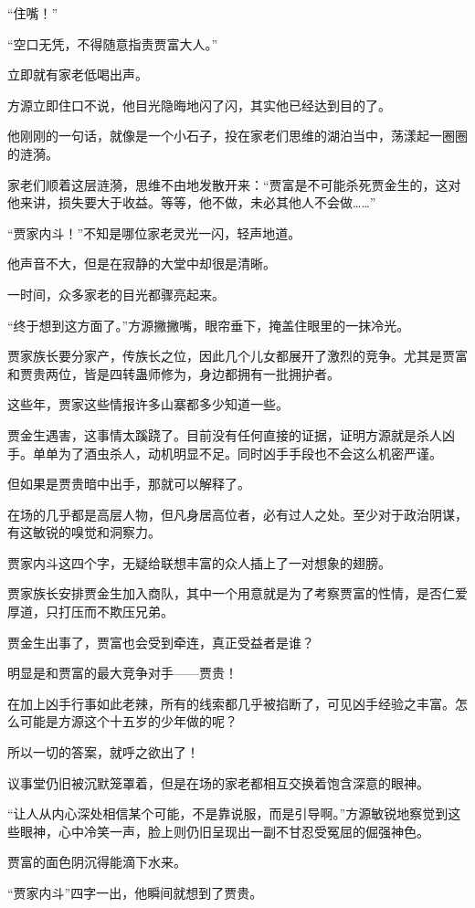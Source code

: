 \begin{this_body}
“住嘴！”

“空口无凭，不得随意指责贾富大人。”

立即就有家老低喝出声。

方源立即住口不说，他目光隐晦地闪了闪，其实他已经达到目的了。

他刚刚的一句话，就像是一个小石子，投在家老们思维的湖泊当中，荡漾起一圈圈的涟漪。

家老们顺着这层涟漪，思维不由地发散开来：“贾富是不可能杀死贾金生的，这对他来讲，损失要大于收益。等等，他不做，未必其他人不会做……”

“贾家内斗！”不知是哪位家老灵光一闪，轻声地道。

他声音不大，但是在寂静的大堂中却很是清晰。

一时间，众多家老的目光都骤亮起来。

“终于想到这方面了。”方源撇撇嘴，眼帘垂下，掩盖住眼里的一抹冷光。

贾家族长要分家产，传族长之位，因此几个儿女都展开了激烈的竞争。尤其是贾富和贾贵两位，皆是四转蛊师修为，身边都拥有一批拥护者。

这些年，贾家这些情报许多山寨都多少知道一些。

贾金生遇害，这事情太蹊跷了。目前没有任何直接的证据，证明方源就是杀人凶手。单单为了酒虫杀人，动机明显不足。同时凶手手段也不会这么机密严谨。

但如果是贾贵暗中出手，那就可以解释了。

在场的几乎都是高层人物，但凡身居高位者，必有过人之处。至少对于政治阴谋，有这敏锐的嗅觉和洞察力。

贾家内斗这四个字，无疑给联想丰富的众人插上了一对想象的翅膀。

贾家族长安排贾金生加入商队，其中一个用意就是为了考察贾富的性情，是否仁爱厚道，只打压而不欺压兄弟。

贾金生出事了，贾富也会受到牵连，真正受益者是谁？

明显是和贾富的最大竞争对手——贾贵！

在加上凶手行事如此老辣，所有的线索都几乎被掐断了，可见凶手经验之丰富。怎么可能是方源这个十五岁的少年做的呢？

所以一切的答案，就呼之欲出了！

议事堂仍旧被沉默笼罩着，但是在场的家老都相互交换着饱含深意的眼神。

“让人从内心深处相信某个可能，不是靠说服，而是引导啊。”方源敏锐地察觉到这些眼神，心中冷笑一声，脸上则仍旧呈现出一副不甘忍受冤屈的倔强神色。

贾富的面色阴沉得能滴下水来。

“贾家内斗”四字一出，他瞬间就想到了贾贵。


\end{this_body}
